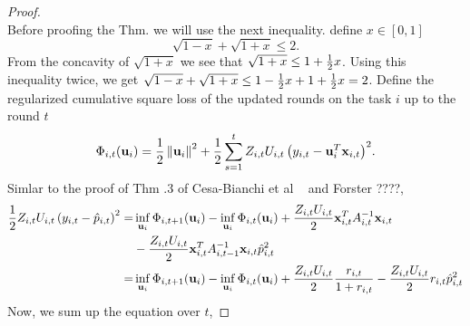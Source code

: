 \begin{proof} 
\\ 
Before proofing the Thm. we will use the next inequality. define $x\in[0,1]$
\begin{equation}
\sqrt{1-x}+\sqrt{1+x}\le2.
\label{technical_inequality}
\end{equation}
From the concavity of $\sqrt{1+x}$ we see that $\sqrt{1+x}\le1+\frac{1}{2} x$. 
Using this inequality twice, we get $\sqrt{1-x}+\sqrt{1+x}\le1-\frac{1}{2} x+1+\frac{1}{2} x=2$.
Define the regularized cumulative square loss of the updated rounds on the task 
$i$ up to the round $t$
\begin{equation*}
\Phi_{i,t}(\mathbf{u}_i)=\frac{1}{2}\left\Vert {\mathbf{u}_i} \right\Vert^2+\frac{1}{2}\sum_{s=1}^{t}{Z_{i,t}U_{i,t}\left({y_{i,t}-\mathbf{u}_i^T\mathbf{x}_{i,t}}\right)}^2.
\end{equation*}
Simlar to the proof of Thm .3 of Cesa-Bianchi et al ~\cite{cesa2006worst} and Forster ????,
\begin{equation*}
\begin{split}
\frac{1}{2} Z_{i,t}U_{i,t}\left({y_{i,t}-\hat{p}_{i,t}}\right)^{2}= &\inf_{\mathbf{u}_i}{\Phi_{i,t+1}}(\mathbf{u}_i)-\inf_{\mathbf{u}_i}{\Phi_{i,t}}(\mathbf{u}_i)+\frac{Z_{i,t}U_{i,t}}{2}\mathbf{x}_{i,t}^TA_{i,t}^{-1}\mathbf{x}_{i,t}\\
&-\frac{Z_{i,t}U_{i,t}}{2}\mathbf{x}_{i,t}^TA_{i,t-1}^{-1}\mathbf{x}_{i,t}\hat{p}_{i,t}^2\\
=&\inf_{\mathbf{u}_i}{\Phi_{i,t+1}}(\mathbf{u}_i)-\inf_{\mathbf{u}_i}{\Phi_{i,t}}(\mathbf{u}_i)+\frac{Z_{i,t}U_{i,t}}{2}\frac{r_{i,t}}{1+r_{i,t}}-\frac{Z_{i,t}U_{i,t}}{2}r_{i,t}\hat{p}_{i,t}^2
\end{split}
\end{equation*} 
Now, we sum up the equation over $t$,
 

\end{proof}
